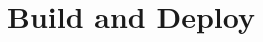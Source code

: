 \documentclass[../main.tex]{subfiles}
\begin{document}
\section{Build and Deploy}\label{sec:setup}
\end{document}
